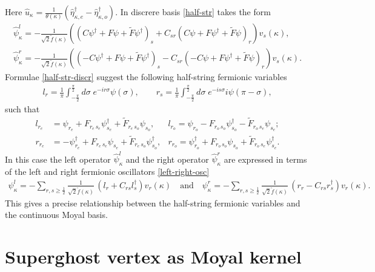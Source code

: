 \documentclass[a4paper,12pt]{article}
\begin{document}
Here $\hat{u}_{\kappa}
=\frac{1}{\theta(\kappa)}
(\hat{\eta}^{\dag}_{\kappa,e}-\hat{\eta}^{\dag}_{\kappa,o})$.
In discrere basis \eqref{half-str} takes the form
\begin{subequations}
\begin{gather}
\hat{\psi}^{l}_{\kappa}=-\frac{1}{\sqrt{2}\tilde{f}(\kappa)}
((C\psi^{\dag}+F\psi+\tilde{F}\psi^{\dag})_{s}
+C_{sr}(C\psi+F\psi^{\dag}+\tilde{F}\psi)_{r})v_{s}(\kappa),\\
\hat{\psi}^{r}_{\kappa}=-\frac{1}{\sqrt{2}\tilde{f}(\kappa)}
((-C\psi^{\dag}+F\psi+\tilde{F}\psi^{\dag})_{s}
-C_{sr}(-C\psi+F\psi^{\dag}+\tilde{F}\psi)_{r})v_{s}(\kappa).
\end{gather}
\label{half-str-discr}
\end{subequations}
Formulae \eqref{half-str-discr}
suggest the following half-string fermionic variables
\begin{gather}
l_{r}=\frac{1}{\pi}\int_{-\frac{\pi}{2}}^{\frac{\pi}{2}}d\sigma\;
e^{-ir\sigma}\psi(\sigma),\qquad
r_{s}=\frac{1}{\pi}\int_{-\frac{\pi}{2}}^{\frac{\pi}{2}}d\sigma\;
e^{-is\sigma}i\psi(\pi-\sigma),
\end{gather}
such that
\begin{subequations}
\begin{align}
l_{r_e}&=\psi_{r_e}+F_{r_e\,s_e}\psi^{\dag}_{s_e}+\tilde{F}_{r_e\,s_o}\psi_{s_o},
&l_{r_o}=\psi_{r_o}-F_{r_o\,s_o}\psi^{\dag}_{s_o}-\tilde{F}_{r_o\,s_e}\psi_{s_e};\\
r_{r_e}&=-\psi^{\dag}_{r_e}+F_{r_e\,s_e}\psi_{s_e}+\tilde{F}_{r_e\,s_o}\psi^{\dag}_{s_o},
&r_{r_o}=\psi^{\dag}_{r_o}+F_{r_o\,s_o}\psi_{s_o}+\tilde{F}_{r_o\,s_e}\psi^{\dag}_{s_e}.
\end{align}
\label{left-right-osc}
\end{subequations}
In this case the left operator $\hat{\psi}^{l}_{\kappa}$
and the right operator $\hat{\psi}^{r}_{\kappa}$ are expressed in terms
of the left and right fermionic oscillators \eqref{left-right-osc}
\begin{gather}
\psi^{l}_{\kappa}
=-\sum_{r,s\geq \tfrac12}\frac{1}{\sqrt{2}\tilde{f}(\kappa)}\,
(l_{r}+C_{rs}l^{\dag}_{s})v_{r}(\kappa)\quad\text{and}\quad
\psi^{r}_{\kappa}
=-\sum_{r,s\geq \tfrac12}\frac{1}{\sqrt{2}\tilde{f}(\kappa)}\,
(r_{r}-C_{rs}r^{\dag}_{s})v_{r}(\kappa).
\end{gather}
This gives a precise relationship between the half-string
fermionic variables and the continuous
Moyal basis.



\section{Superghost vertex as Moyal kernel}
\label{sec:ghost-ver}
\setcounter{equation}{0}
\end{document}

